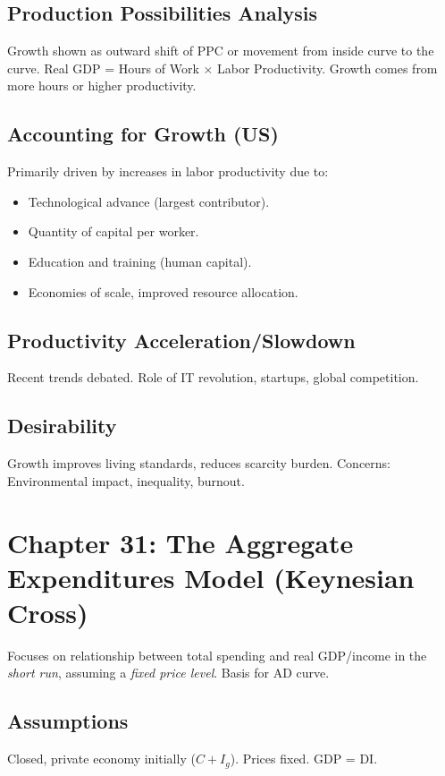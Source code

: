 \documentclass{article}
\begin{document}
\subsection*{Production Possibilities Analysis}
Growth shown as outward shift of PPC or movement from inside curve to the curve. Real GDP = Hours of Work $\times$ Labor Productivity. Growth comes from more hours or higher productivity.

\subsection*{Accounting for Growth (US)}
Primarily driven by increases in labor productivity due to:
\begin{itemize}
    \item Technological advance (largest contributor).
    \item Quantity of capital per worker.
    \item Education and training (human capital).
    \item Economies of scale, improved resource allocation.
\end{itemize}

\subsection*{Productivity Acceleration/Slowdown}
Recent trends debated. Role of IT revolution, startups, global competition.

\subsection*{Desirability}
Growth improves living standards, reduces scarcity burden. Concerns: Environmental impact, inequality, burnout.

\section*{Chapter 31: The Aggregate Expenditures Model (Keynesian Cross)}

Focuses on relationship between total spending and real GDP/income in the \textit{short run}, assuming a \textit{fixed price level}. Basis for AD curve.

\subsection*{Assumptions}
Closed, private economy initially ($C + I_g$). Prices fixed. GDP = DI.
\end{document}
